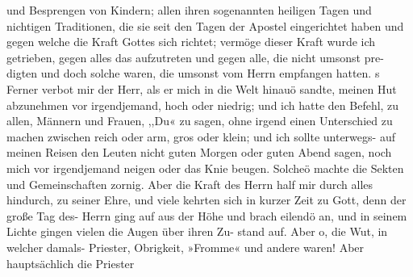 und Besprengen von Kindern; allen ihren sogenannten heiligen
Tagen und nichtigen Traditionen, die sie seit den Tagen der
Apostel eingerichtet haben und gegen welche die Kraft Gottes
sich richtet; vermöge dieser Kraft wurde ich getrieben, gegen
alles das aufzutreten und gegen alle, die nicht umsonst pre-
digten und doch solche waren, die umsonst vom Herrn  empfangen
hatten. s
Ferner verbot mir der Herr, als er mich in die Welt hinauö
sandte, meinen Hut abzunehmen vor irgendjemand, hoch oder
niedrig; und ich hatte den Befehl, zu allen, Männern und Frauen,
,,Du« zu sagen, ohne irgend einen Unterschied zu machen zwischen
reich oder arm, gros oder klein; und ich sollte unterwegs- auf
meinen Reisen den Leuten nicht guten Morgen oder guten Abend
sagen, noch mich vor irgendjemand neigen oder das Knie beugen.
Solcheö machte die Sekten und Gemeinschaften zornig. Aber die
Kraft des Herrn  half mir durch alles hindurch, zu seiner Ehre,
und viele kehrten sich in kurzer Zeit zu Gott, denn der große
Tag des- Herrn  ging auf aus der Höhe und brach eilendö an,
und in seinem Lichte gingen vielen die Augen über ihren Zu-
stand auf.
Aber o, die Wut, in welcher damals- Priester, Obrigkeit,
»Fromme« und andere waren! Aber hauptsächlich die Priester


